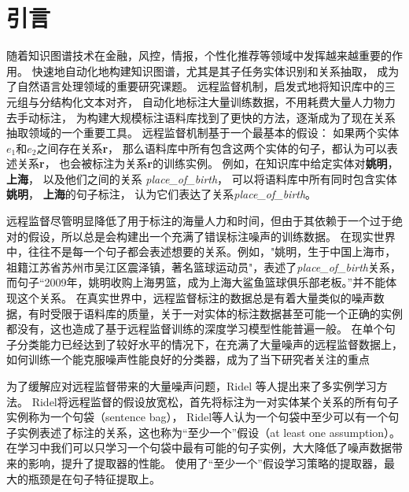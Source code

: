 \documentclass[UTF8]{csoarticle}
\begin{document}
\maketitle



\section{引言}
随着知识图谱技术在金融，风控，情报，个性化推荐等领域中发挥越来越重要的作用。
快速地自动化地构建知识图谱，尤其是其子任务实体识别和关系抽取，
成为了自然语言处理领域的重要研究课题。
远程监督机制\cite{bib1}，启发式地将知识库中的三元组与分结构化文本对齐，
自动化地标注大量训练数据，不用耗费大量人力物力去手动标注，
为构建大规模标注语料库找到了更快的方法，逐渐成为了现在关系抽取领域的一个重要工具。
远程监督机制基于一个最基本的假设：
如果两个实体\textbf{$e_1$}和\textbf{$e_2$}之间存在关系\textbf{r}，
那么语料库中所有包含这两个实体的句子，都认为可以表述关系\textbf{r}，
也会被标注为关系\textbf{r}的训练实例。
例如，在知识库中给定实体对\textbf{姚明}，\textbf{上海}，
以及他们之间的关系 \textit{place\_of\_birth}，
可以将语料库中所有同时包含实体\textbf{姚明}， \textbf{上海}的句子标注，
认为它们表达了关系\textit{place\_of\_birth}。

远程监督尽管明显降低了用于标注的海量人力和时间，但由于其依赖于一个过于绝对的假设，所以总是会构建出一个充满了错误标注噪声的训练数据。
在现实世界中，往往不是每一个句子都会表述想要的关系。例如，"姚明，生于中国上海市，祖籍江苏省苏州市吴江区震泽镇，著名篮球运动员"，表述了\textit{place\_of\_birth}关系，
而句子“2009年，姚明收购上海男篮，成为上海大鲨鱼篮球俱乐部老板。”并不能体现这个关系。
在真实世界中，远程监督标注的数据总是有着大量类似的噪声数据，有时受限于语料库的质量，关于一对实体的标注数据甚至可能一个正确的实例都没有，这也造成了基于远程监督训练的深度学习模型性能普遍一般。
在单个句子分类能力已经达到了较好水平的情况下，在充满了大量噪声的远程监督数据上，如何训练一个能克服噪声性能良好的分类器，成为了当下研究者关注的重点


为了缓解应对远程监督带来的大量噪声问题，Ridel\cite{bib2} 等人提出来了多实例学习方法。
Ridel将远程监督的假设放宽松，首先将标注为一对实体某个关系的所有句子实例称为一个句袋（sentence bag），
Ridel等人认为一个句袋中至少可以有一个句子实例表述了标注的关系，这也称为“至少一个”假设（at least one assumption）。在学习中我们可以只学习一个句袋中最有可能的句子实例，大大降低了噪声数据带来的影响，提升了提取器的性能。
使用了“至少一个”假设学习策略的提取器，最大的瓶颈是在句子特征提取上。
\end{document}
